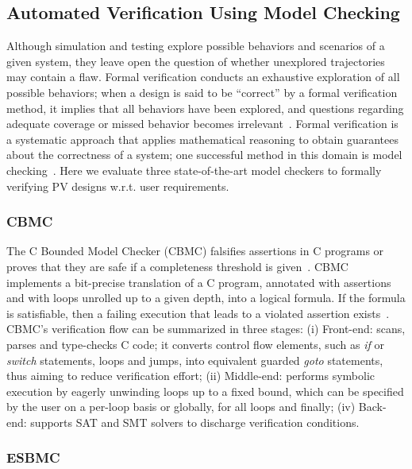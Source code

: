 \documentclass[review]{elsarticle}
\begin{document}
\subsection{Automated Verification Using Model Checking}
\label{sec:AutomatedVerification}

Although simulation and testing explore possible behaviors and scenarios of a given system, 
they leave open the question of whether unexplored trajectories may contain a flaw. 
Formal verification conducts an exhaustive exploration of all possible behaviors; 
when a design is said to be ``correct'' by a formal verification method, it implies that all 
behaviors have been explored, and questions regarding adequate coverage or missed behavior 
becomes irrelevant~\cite{Clarke2012}. Formal verification is a systematic approach that 
applies mathematical reasoning to obtain guarantees about the correctness of a system; 
one successful method in this domain is model checking~\cite{Clarke2012}. 
Here we evaluate three state-of-the-art model checkers to formally verifying PV designs w.r.t. user requirements.

\subsubsection{CBMC}

The C Bounded Model Checker (CBMC) falsifies assertions in C programs 
or proves that they are safe if a completeness threshold is given~\cite{Kroening}. 
CBMC implements a bit-precise translation of a C program, annotated with assertions 
and with loops unrolled up to a given depth, into a logical formula. If the formula is satisfiable, 
then a failing execution that leads to a violated assertion exists~\cite{Kroening}. CBMC's verification 
flow can be summarized in three stages: (i) Front-end: scans, parses and type-checks C code; 
it converts control flow elements, such as \textit{if} or \textit{switch} statements, loops and jumps, 
into equivalent guarded \textit{goto} statements, thus aiming to reduce verification effort; 
(ii) Middle-end: performs symbolic execution by eagerly unwinding loops up to a fixed bound, 
which can be specified by the user on a per-loop basis or globally, for all loops and finally; 
(iv) Back-end: supports SAT and SMT solvers to discharge verification conditions.

\subsubsection{ESBMC}
\end{document}
